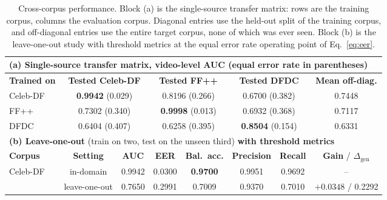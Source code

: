 \documentclass[journal,onecolumn]{IEEEtran}
\newcommand{\best}[1]{\textbf{#1}}
\begin{document}
\begin{table}[!ht]
\centering
\caption{Cross-corpus performance. Block (a) is the single-source transfer
matrix: rows are the training corpus, columns the evaluation corpus. Diagonal
entries use the held-out split of the training corpus, and off-diagonal entries
use the entire target corpus, none of which was ever seen. Block (b) is
the leave-one-out study with threshold metrics at the equal error rate operating
point of Eq.~\eqref{eq:eer}.}
\label{tab:performance}

\footnotesize
\setlength{\tabcolsep}{5pt}

\begin{tabular}{lccccccc}
\toprule
\multicolumn{8}{l}{
    \textbf{(a) Single-source transfer matrix},
    video-level AUC (equal error rate in parentheses)
} \\
\midrule

\textbf{Trained on}
& \multicolumn{2}{c}{\textbf{Tested Celeb-DF}}
& \multicolumn{2}{c}{\textbf{Tested FF++}}
& \multicolumn{2}{c}{\textbf{Tested DFDC}}
& \textbf{Mean off-diag.} \\
\midrule

Celeb-DF
& \multicolumn{2}{c}{\best{0.9942} (0.029)}
& \multicolumn{2}{c}{0.8196 (0.266)}
& \multicolumn{2}{c}{0.6700 (0.382)}
& 0.7448 \\

FF++
& \multicolumn{2}{c}{0.7302 (0.340)}
& \multicolumn{2}{c}{\best{0.9998} (0.013)}
& \multicolumn{2}{c}{0.6932 (0.368)}
& 0.7117 \\

DFDC
& \multicolumn{2}{c}{0.6404 (0.407)}
& \multicolumn{2}{c}{0.6258 (0.395)}
& \multicolumn{2}{c}{\best{0.8504} (0.154)}
& 0.6331 \\

\midrule
\multicolumn{8}{l}{
    \textbf{(b) Leave-one-out}
    (train on two, test on the unseen third)
    \textbf{with threshold metrics}
} \\
\midrule

\textbf{Corpus}
& \textbf{Setting}
& \textbf{AUC}
& \textbf{EER}
& \textbf{Bal.\ acc.}
& \textbf{Precision}
& \textbf{Recall}
& \textbf{Gain} / $\Delta_{\text{gen}}$ \\
\midrule

\multirow{2}{*}{Celeb-DF}
& in-domain
& 0.9942
& 0.0300
& \best{0.9700}
& 0.9951
& 0.9692
& -- \\

& leave-one-out
& 0.7650
& 0.2991
& 0.7009
& 0.9370
& 0.7010
& \best{$+0.0348$} / 0.2292 \\


\end{tabular}
\end{table}
\end{document}
